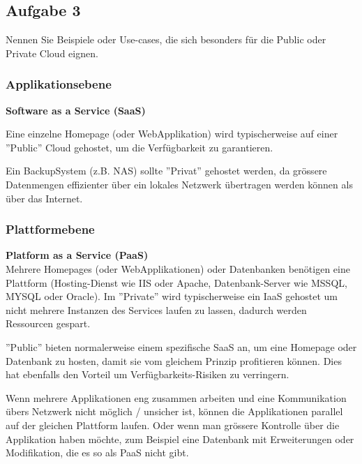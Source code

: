 \documentclass[11pt,titlepage]{article}
\newenvironment{shadedquotation}
 {\begin{shaded*}
  \quoting[leftmargin=0pt, vskip=0pt]
 }
 {\endquoting
 \end{shaded*}
}
\begin{document}
  \par\medskip

\subsection{Aufgabe 3}
\label{sec:Aufgabe-3}

\begin{shadedquotation}
  Nennen Sie Beispiele oder Use-cases, die sich besonders für die Public oder Private Cloud eignen.
\end{shadedquotation}

\subsubsection{Applikationsebene}
\label{subsec:Aufgabe-3_Applikationsebene}
{\large\bf Software as a Service (SaaS)} \\\medskip

Eine einzelne Homepage (oder WebApplikation) wird typischerweise auf einer ''Public'' Cloud gehostet, um die Verfügbarkeit zu garantieren.
\medskip

Ein BackupSystem (z.B. NAS) sollte ''Privat'' gehostet werden, da grössere Datenmengen effizienter über ein lokales Netzwerk übertragen werden können als über das Internet.

\subsubsection{Plattformebene}
\label{subsec:Aufgabe-3_Plattformebene}
{\large\bf Platform as a Service (PaaS)} \\\medskip
Mehrere Homepages (oder WebApplikationen) oder Datenbanken benötigen eine Plattform (Hosting-Dienst wie IIS oder Apache, Datenbank-Server wie MSSQL, MYSQL oder Oracle).
Im ''Private'' wird typischerweise ein IaaS gehostet um nicht mehrere Instanzen des Services laufen zu lassen, dadurch werden Ressourcen gespart.

''Public'' bieten normalerweise einem spezifische SaaS an, um eine Homepage oder Datenbank zu hosten, damit sie vom gleichem Prinzip profitieren können. Dies hat ebenfalls den Vorteil um Verfügbarkeits-Risiken zu verringern.
\par\medskip
Wenn mehrere Applikationen eng zusammen arbeiten und eine Kommunikation übers Netzwerk nicht möglich / unsicher ist, können die Applikationen parallel auf der gleichen Plattform laufen.
Oder wenn man grössere Kontrolle über die Applikation haben möchte, zum Beispiel eine Datenbank mit Erweiterungen oder Modifikation, die es so als PaaS nicht gibt.
\end{document}
